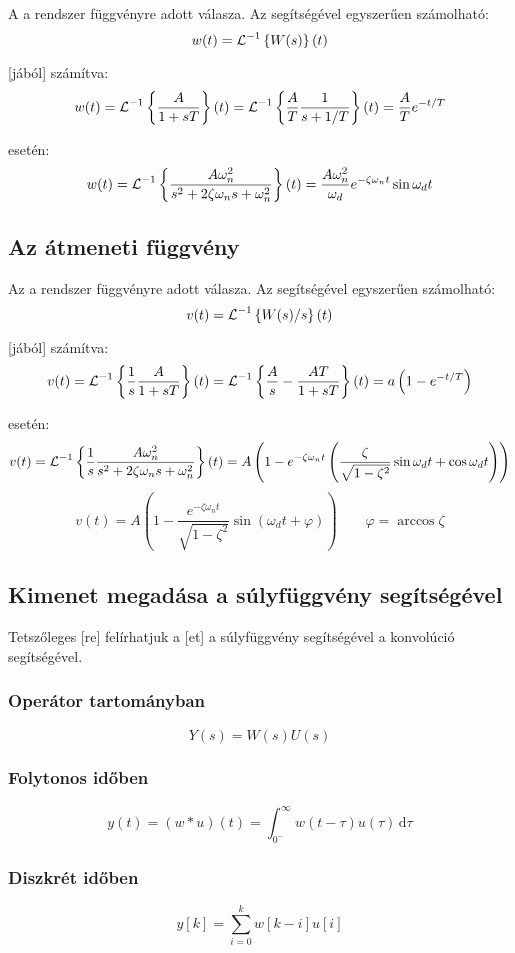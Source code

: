 \documentclass[../main.tex]{subfiles}
\begin{document}
A  a rendszer  függvényre adott válasza.
Az  segítségével egyszerűen számolható:
\[
  w(t) = \operatorname{\mathcal{L}}^{-1} \left\{ W(s) \right\}(t)
\]

 [jából] számítva:
\[
  w(t)
  = \operatorname{\mathcal{L}}^{-1} \left\{ \frac{A}{1 + sT} \right\} (t)
  = \operatorname{\mathcal{L}}^{-1} \left\{ \frac{A}{T} \frac{1}{s + 1/T} \right\} (t)
  = \frac{A}{T} e^{-t / T}
\]

 esetén:
\[
  w(t)
  = \operatorname{\mathcal{L}}^{-1} \left\{ \frac{A \omega_n^2}{s^2 + 2 \zeta \omega_n  s + \omega_n^2} \right\} (t)
  = \frac{A \omega_n^2}{\omega_d} e^{-\zeta \omega_n t } \sin \omega_d t
\]

\subsection{Az átmeneti függvény}

Az  a rendszer  függvényre adott válasza.
Az  segítségével egyszerűen számolható:
\[
  v(t) = \operatorname{\mathcal{L}}^{-1} \left\{ W(s) / s\right\}(t)
\]

 [jából] számítva:
\[
  v(t)
  = \operatorname{\mathcal{L}}^{-1} \left\{ \frac{1}{s} \frac{A}{1 + sT} \right\} (t)
  = \operatorname{\mathcal{L}}^{-1} \left\{ \frac{A}{s} -  \frac{AT}{1 + sT} \right\} (t)
  = a \left( 1 - e^{-t/T} \right)
\]

 esetén:
\[
  v(t)
  = \operatorname{\mathcal{L}}^{-1} \left\{ \frac{1}{s} \frac{A \omega_n^2}{s^2 + 2 \zeta \omega_n	s + \omega_n^2} \right\} (t)
  = A \left( 1 - e^{-\zeta \omega_n t} \left( \frac{\zeta}{\sqrt{1 - \zeta^2}} \sin \omega_d t + \cos \omega_d t
  \right) \right)
\]\[
  v(t) = A \left( 1 - \frac{e^{-\zeta \omega_n t}}{\sqrt{1 - \zeta^2}} \sin \left( \omega_d t + \varphi \right)
  \right)
  \qquad
  \varphi = \arccos \zeta
\]

\subsection{Kimenet megadása a súlyfüggvény segítségével}

Tetszőleges [re] felírhatjuk a [et] a súlyfüggvény
segítségével a konvolúció segítségével.

\subsubsection*{Operátor tartományban}
\[
  Y(s) = W(s)U(s)
\]

\subsubsection*{Folytonos időben}
\[
  y(t) = (w * u)(t) = \int_{0^-}^\infty w(t - \tau) u(\tau) \, \mathrm{d} \tau
\]

\subsubsection*{Diszkrét időben}
\[
  y[k] = \sum_{i=0}^k w [k - i] u[i]
\]
\end{document}
